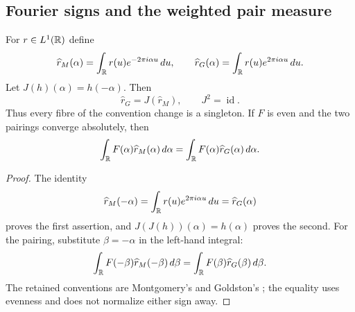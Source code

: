 \subsection{Fourier signs and the weighted pair measure}

\begin{theorem}
\label{thm:fourier-sign-reflection-complete}
For $r\in L^1(\mathbb R)$ define
\[
 \widehat r_M(\alpha)=\int_\mathbb R r(u)e^{-2\pi i\alpha u}\,du,
 \qquad
 \widehat r_G(\alpha)=\int_\mathbb R r(u)e^{2\pi i\alpha u}\,du.
\]
Let $J(h)(\alpha)=h(-\alpha)$.  Then
\[
 \widehat r_G=J(\widehat r_M),\qquad J^2=\operatorname{id}.
\]
Thus every fibre of the convention change is a singleton.  If $F$ is even and
the two pairings converge absolutely, then
\begin{equation}
 \int_\mathbb R F(\alpha)\widehat r_M(\alpha)\,d\alpha
 =\int_\mathbb R F(\alpha)\widehat r_G(\alpha)\,d\alpha.
 \label{eq:fourier-pairing-sign-complete}
\end{equation}
\end{theorem}

\begin{proof}
The identity
\[
 \widehat r_M(-\alpha)
 =\int_\mathbb R r(u)e^{2\pi i\alpha u}\,du
 =\widehat r_G(\alpha)
\]
proves the first assertion, and $J(J(h))(\alpha)=h(\alpha)$ proves the second.
For the pairing, substitute $\beta=-\alpha$ in the left-hand integral:
\[
 \int_\mathbb R F(-\beta)\widehat r_M(-\beta)\,d\beta
 =\int_\mathbb R F(\beta)\widehat r_G(\beta)\,d\beta.
\]
The retained conventions are Montgomery's and Goldston's
\cite[pp.~181--182, eqs.~(3)--(6)]{montgomery1973}
\cite[Sec.~5]{goldston2004}; the equality uses evenness and does not normalize
either sign away.
\end{proof}

